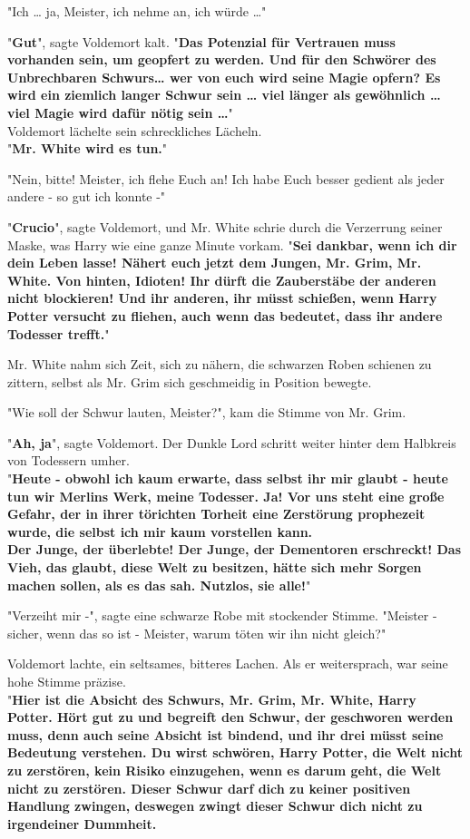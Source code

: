{"Ich … ja, Meister, ich nehme an, ich würde …"

"\textbf{Gut}", sagte Voldemort kalt. "\textbf{Das Potenzial für Vertrauen muss vorhanden sein, um geopfert zu werden. Und für den Schwörer des Unbrechbaren Schwurs… wer von euch wird seine Magie opfern? Es wird ein ziemlich langer Schwur sein … viel länger als gewöhnlich … viel Magie wird dafür nötig sein …}"\\ Voldemort lächelte sein schreckliches Lächeln.\\ "\textbf{Mr. White wird es tun.}"

"Nein, bitte! Meister, ich flehe Euch an! Ich habe Euch besser gedient als jeder andere - so gut ich konnte -"

"\textbf{Crucio}", sagte Voldemort, und Mr. White schrie durch die Verzerrung seiner Maske, was Harry wie eine ganze Minute vorkam. "\textbf{Sei dankbar, wenn ich dir dein Leben lasse! Nähert euch jetzt dem Jungen, Mr. Grim, Mr. White. Von hinten, Idioten! Ihr dürft die Zauberstäbe der anderen nicht blockieren! Und ihr anderen, ihr müsst schießen, wenn Harry Potter versucht zu fliehen, auch wenn das bedeutet, dass ihr andere Todesser trefft.}"

Mr. White nahm sich Zeit, sich zu nähern, die schwarzen Roben schienen zu zittern, selbst als Mr. Grim sich geschmeidig in Position bewegte.

"Wie soll der Schwur lauten, Meister?", kam die Stimme von Mr. Grim.

"\textbf{Ah, ja}", sagte Voldemort. Der Dunkle Lord schritt weiter hinter dem Halbkreis von Todessern umher.\\ "\textbf{Heute - obwohl ich kaum erwarte, dass selbst ihr mir glaubt - heute tun wir Merlins Werk, meine Todesser. Ja! Vor uns steht eine große Gefahr, der in ihrer törichten Torheit eine Zerstörung prophezeit wurde, die selbst ich mir kaum vorstellen kann.\\ Der Junge, der überlebte! Der Junge, der Dementoren erschreckt! Das Vieh, das glaubt, diese Welt zu besitzen, hätte sich mehr Sorgen machen sollen, als es das sah. Nutzlos, sie alle!}"

"Verzeiht mir -", sagte eine schwarze Robe mit stockender Stimme. "Meister - sicher, wenn das so ist - Meister, warum töten wir ihn nicht gleich?"

Voldemort lachte, ein seltsames, bitteres Lachen. Als er weitersprach, war seine hohe Stimme präzise.\\ "\textbf{Hier ist die Absicht des Schwurs, Mr. Grim, Mr. White, Harry Potter. Hört gut zu und begreift den Schwur, der geschworen werden muss, denn auch seine Absicht ist bindend, und ihr drei müsst seine Bedeutung verstehen. Du wirst schwören, Harry Potter, die Welt nicht zu zerstören, kein Risiko einzugehen, wenn es darum geht, die Welt nicht zu zerstören. Dieser Schwur darf dich zu keiner positiven Handlung zwingen, deswegen zwingt dieser Schwur dich nicht zu irgendeiner Dummheit.}

}
